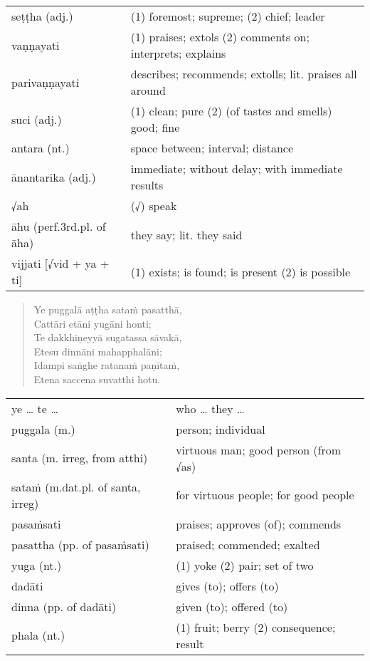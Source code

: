 \documentclass[11pt,oneside]{memoir}
\begin{document}
\begin{longtable}{L{\colOne} L{\colTwo}}
seṭṭha (adj.) & (1) foremost; supreme; (2) chief; leader\\[0pt]
vaṇṇayati & (1) praises; extols (2) comments on; interprets; explains\\[0pt]
parivaṇṇayati & describes; recommends; extolls; lit. praises all around\\[0pt]
suci (adj.) & (1) clean; pure (2) (of tastes and smells) good; fine\\[0pt]
antara (nt.) & space between; interval; distance\\[0pt]
ānantarika (adj.) & immediate; without delay; with immediate results\\[0pt]
√ah & (√) speak\\[0pt]
āhu (perf.3rd.pl. of āha) & they say; lit. they said\\[0pt]
vijjati [√vid + ya + ti] & (1) exists; is found; is present (2) is possible\\[0pt]
\end{longtable}

\begin{quote}
Ye puggalā aṭṭha sataṁ pasatthā, \\[0pt]
Cattāri etāni yugāni honti; \\[0pt]
Te dakkhiṇeyyā sugatassa sāvakā, \\[0pt]
Etesu dinnāni mahapphalāni; \\[0pt]
Idampi saṅghe ratanaṁ paṇītaṁ, \\[0pt]
Etena saccena suvatthi hotu.
\end{quote}

\begin{longtable}{L{\colOne} L{\colTwo}}
ye \ldots{} te \ldots{} & who \ldots{} they \ldots{}\\[0pt]
puggala (m.) & person; individual\\[0pt]
santa (m. irreg, from atthi) & virtuous man; good person (from √as)\\[0pt]
sataṁ (m.dat.pl. of santa, irreg) & for virtuous people; for good people\\[0pt]
pasaṁsati & praises; approves (of); commends\\[0pt]
pasattha (pp. of pasaṁsati) & praised; commended; exalted\\[0pt]
yuga (nt.) & (1) yoke (2) pair; set of two\\[0pt]
dadāti & gives (to); offers (to)\\[0pt]
dinna (pp. of dadāti) & given (to); offered (to)\\[0pt]
phala (nt.) & (1) fruit; berry (2) consequence; result\\[0pt]
\end{longtable}
\end{document}
